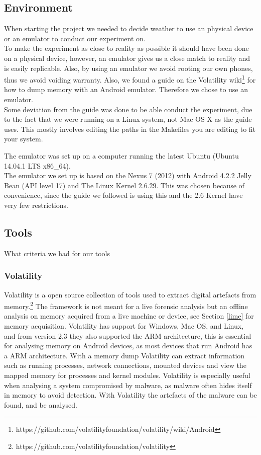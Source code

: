 \subsection{Environment}
When starting the project we needed to decide weather to use an physical device or an emulator
to conduct our experiment on.\\
To make the experiment as close to reality as possible it should have been done on a physical device, 
however, an emulator gives us a close match to reality and is easily replicable. Also, by using an emulator 
we avoid rooting our own phones, thus we avoid voiding warranty. Also, we found a guide on the Volatility 
wiki\footnote{https://github.com/volatilityfoundation/volatility/wiki/Android} for how to dump memory with 
an Android emulator. Therefore we chose to use an emulator.\\
Some deviation from the guide was done to be able conduct the experiment, due to the fact that we were running on 
a Linux system, not Mac OS X as the guide uses. This mostly involves editing the paths in the Makefiles you are editing 
to fit your system. %

The emulator was set up on a computer running the latest Ubuntu (Ubuntu 14.04.1 LTS x86\_64).\\
The emulator we set up is based on the Nexus 7 (2012) with Android 4.2.2 Jelly Bean (API level 17) and The Linux Kernel 2.6.29. 
This was chosen because of convenience, since the guide we followed is using this and the 2.6 Kernel have very few restrictions.
\subsection{Tools}
What criteria we had for our tools
  \subsubsection{Volatility}
  Volatility is a open source collection of tools used to extract digital
  artefacts from memory.\footnote{https://github.com/volatilityfoundation/volatility} 
  The framework is not meant for a live forensic analysis but an offline analysis
  on memory acquired from a live machine or device, see Section \ref{lime} for
  memory acquisition. Volatility has support for Windows, Mac OS, and Linux, and
  from version 2.3 they also supported the ARM architecture, this is essential
  for analysing memory on Android devices, as most devices that run Android has a
  ARM architecture. With a memory dump Volatility can extract information such as
  running processes, network connections, mounted devices and view the mapped
  memory for processes and kernel modules. Volatility is especially useful when
  analysing a system compromised by malware, as malware often hides itself in
  memory to avoid detection. With Volatility the artefacts of the malware can be
  found, and be analysed. \\
  
